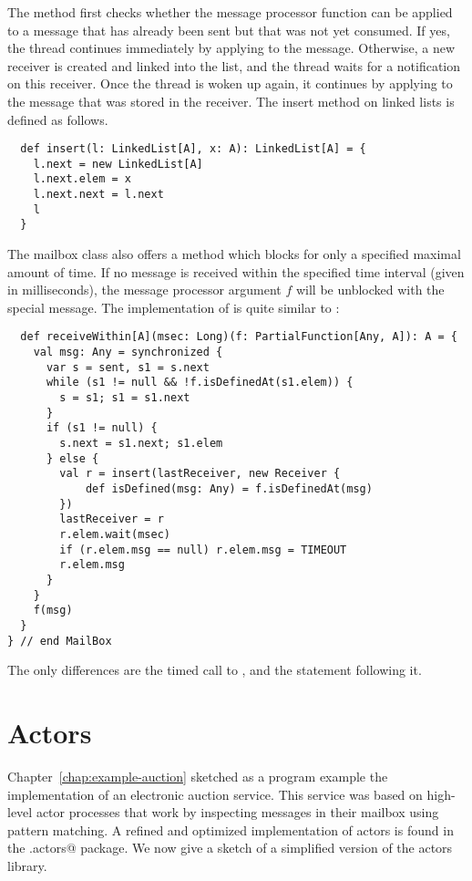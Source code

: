The  method first checks whether the message processor function
 can be applied to a message that has already been sent but that
was not yet consumed. If yes, the thread continues immediately by
applying  to the message. Otherwise, a new receiver is created
and linked into the  list, and the thread waits for a
notification on this receiver. Once the thread is woken up again, it
continues by applying  to the message that was stored in the
receiver. The insert method on linked lists is defined as follows.
\begin{lstlisting}
  def insert(l: LinkedList[A], x: A): LinkedList[A] = {
    l.next = new LinkedList[A]
    l.next.elem = x
    l.next.next = l.next
    l
  }
\end{lstlisting}
The mailbox class also offers a method 
which blocks for only a specified maximal amount of time.  If no
message is received within the specified time interval (given in
milliseconds), the message processor argument $f$ will be unblocked
with the special  message.  The implementation of
 is quite similar to :
\begin{lstlisting}
  def receiveWithin[A](msec: Long)(f: PartialFunction[Any, A]): A = {
    val msg: Any = synchronized {
      var s = sent, s1 = s.next
      while (s1 != null && !f.isDefinedAt(s1.elem)) {
        s = s1; s1 = s1.next 
      }
      if (s1 != null) {
        s.next = s1.next; s1.elem
      } else {
        val r = insert(lastReceiver, new Receiver {
            def isDefined(msg: Any) = f.isDefinedAt(msg)
        })
        lastReceiver = r
        r.elem.wait(msec)
        if (r.elem.msg == null) r.elem.msg = TIMEOUT
        r.elem.msg
      }
    }
    f(msg)
  }
} // end MailBox
\end{lstlisting}
The only differences are the timed call to , and the
statement following it.

\section{Actors}
\label{sec:actors}

Chapter~\ref{chap:example-auction} sketched as a program example the
implementation of an electronic auction service. This service was
based on high-level actor processes that work by inspecting messages
in their mailbox using pattern matching. A refined and optimized
implementation of actors is found in the \lstinline@scala.actors@
package.  We now give a sketch of a simplified version of the actors library.

